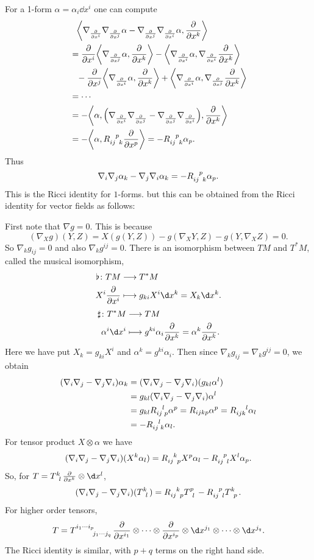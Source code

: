 \documentclass[12pt]{article}
\begin{document}
For a 1-form \(\alpha=\alpha_i \dd{x^i}\) one can compute
\begin{align*}
  &\phantom{=}\left<\nabla_{\pd{x^i}}\nabla_{\pd{x^j}}\alpha-\nabla_{\pd{x^j}}
  \nabla_{\pd{x^i}}\alpha,\pd{x^k}\right> \\
  &=\pd{x^i}\left<\nabla_{\pd{x^j}}\alpha,\pd{x^k}\right>
  -\left<\nabla_{\pd{x^i}}\alpha,\nabla_{\pd{x^i}}\pd{x^k}\right> \\
  &\phantom{=}-\pd{x^j}\left<\nabla_{\pd{x^i}}\alpha,\pd{x^k}\right>
  +\left<\nabla_{\pd{x^i}}\alpha,\nabla_{\pd{x^j}}\pd{x^k}\right> \\
  &=\cdots \\
  &=-\left<\alpha,\left(\nabla_{\pd{x^i}}\nabla_{\pd{x^j}}
  -\nabla_{\pd{x^j}}\nabla_{\pd{x^i}}\right),\pd{x^k}\right> \\
  &=-\left<\alpha,R\indices{_{ij}^p_k}\pd{x^p}\right> =-R\indices{_{ij}^p_k}
  \alpha_p
.\end{align*}
Thus \[
  \nabla_i \nabla_j \alpha_k-\nabla_j \nabla_i \alpha_k=-R\indices{_{ij}^p_k}
  \alpha_p
.\] This is the Ricci identity for \(1\)-forms. but this can be obtained from 
the Ricci identity for vector fields as follows:

First note that \(\nabla g=0\). This is because \[
  (\nabla_X g)(Y,Z)=X(g(Y,Z))-g(\nabla_X Y,Z)-g(Y,\nabla_X Z)=0
.\] So \(\nabla_k g_{ij}=0\) and also \(\nabla_k g^{ij}=0\). There is an
isomorphism between \(TM\) and \(T^*M\), called the musical isomorphism,
\begin{align*}
  \flat\colon TM &\longrightarrow T^*M \\
  X^i\pd{x^i} &\longmapsto g_{ki}X^i\dd{x^k}=X_k\dd{x^k}
.\end{align*}
\begin{align*}
  \sharp\colon T^*M &\longrightarrow TM \\
  \alpha^i\dd{x^i} &\longmapsto g^{ki}\alpha_i\pd{x^k}=\alpha^k\pd{x^k}
.\end{align*}
Here we have put \(X_k=g_{ki}X^i\) and \(\alpha^k=g^{ki}\alpha_i\). Then
since \(\nabla_k g_{ij}=\nabla_k g^{ij}=0\), we obtain 
\begin{align*}
  (\nabla_i \nabla_j-\nabla_j \nabla_i)\alpha_k
  &=(\nabla_i \nabla_j-\nabla_j \nabla_i)(g_{kl}\alpha^l) \\
  &=g_{kl}(\nabla_i \nabla_j-\nabla_j \nabla_i)\alpha^l \\
  &=g_{kl}R\indices{_{ij}^l_p}\alpha^p=R_{ijkp}\alpha^p=R\indices{_{ijk}^l}
  \alpha_l \\
  &=-R\indices{_{ij}^l_k}\alpha_l
.\end{align*}
For tensor product \(X\otimes \alpha\) we have \[
  (\nabla_i \nabla_j-\nabla_j\nabla_i)(X^k\alpha_l)=R\indices{_{ij}^k_p}X^p
  \alpha_l-R\indices{_{ij}^p_l}X^l\alpha_p
.\] So, for \(T=T\indices{^k_l}\pd{x^k}\otimes \dd{x^l}\), \[
  (\nabla_i \nabla_j-\nabla_j\nabla_i)(T\indices{^k_l})
  =R\indices{_{ij}^k_p}T\indices{^p_l}-R\indices{_{ij}^p_l}T\indices{^k_p}
.\] For higher order tensors, \[
  T=T\indices{^{i_1\cdots i_p}_{j_1\cdots j_q}}\pd{x^{i_1}}\otimes\cdots\otimes 
  \pd{x^{i_p}}\otimes \dd{x^{j_1}}\otimes \cdots \otimes \dd{x^{j_q}}
.\] The Ricci identity is similar, with \(p+q\) terms on the right hand side.
\end{document}
